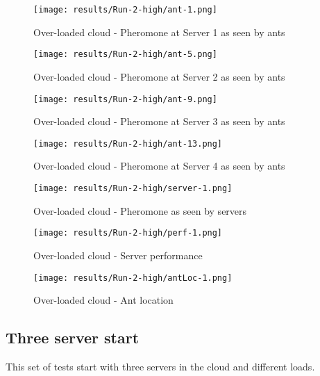 \begin{figure}[!h]
	\centering
		\texttt{[image: results/Run-2-high/ant-1.png]}
	\caption{Over-loaded cloud - Pheromone at Server 1 as seen by ants}
	\label{fig:2serv-ant1-high}
\end{figure}

\begin{figure}
	\centering
		\texttt{[image: results/Run-2-high/ant-5.png]}
	\caption{Over-loaded cloud - Pheromone at Server 2 as seen by ants}
	\label{fig:2serv-ant5-high}
\end{figure}

\begin{figure}
	\centering
		\texttt{[image: results/Run-2-high/ant-9.png]}
	\caption{Over-loaded cloud - Pheromone at Server 3 as seen by ants}
	\label{fig:2serv-ant9-high}
\end{figure}

\begin{figure}
	\centering
		\texttt{[image: results/Run-2-high/ant-13.png]}
	\caption{Over-loaded cloud - Pheromone at Server 4 as seen by ants}
	\label{fig:2serv-ant13-high}
\end{figure}

\begin{figure}
	\centering
		\texttt{[image: results/Run-2-high/server-1.png]}
	\caption{Over-loaded cloud - Pheromone as seen by servers}
	\label{fig:2serv-pher-high}
\end{figure}

\begin{figure}
	\centering
		\texttt{[image: results/Run-2-high/perf-1.png]}
	\caption{Over-loaded cloud - Server performance}
	\label{fig:2serv-perf-high}
\end{figure}

\begin{figure}
	\centering
		\texttt{[image: results/Run-2-high/antLoc-1.png]}
	\caption{Over-loaded cloud - Ant location}
	\label{fig:2serv-antloc-high}
\end{figure}

\subsection{Three server start}

This set of tests start with three servers in the cloud and different loads.


